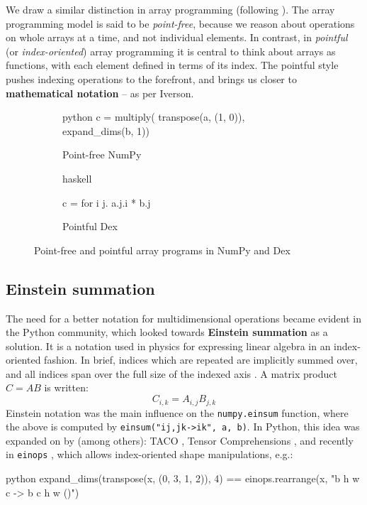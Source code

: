 We draw a similar distinction in array programming (following \textcite{paszke2021getting}).
The array programming model is said to be \textit{point-free}, because we reason about operations on whole arrays at a time, and not individual elements. 
In contrast, in \textit{pointful} (or \textit{index-oriented}) array programming it is central to think about arrays as functions, with each element defined in terms of its index. 
The pointful style pushes indexing operations to the forefront, and brings us closer to \textbf{mathematical notation} -- as per Iverson. 

\begin{figure}[h]
\centering
\begin{subfigure}{.4\textwidth}
  \centering
    \begin{cminted}{python}
c = multiply(
  transpose(a, (1, 0)),
  expand_dims(b, 1))
    \end{cminted}
      \caption{Point-free NumPy}
\end{subfigure}%
\begin{subfigure}{.4\textwidth}
  \centering
  \begin{cminted}{haskell}

c = for i j. a.j.i * b.j
  
  \end{cminted}
  \caption{Pointful Dex}
\end{subfigure}
\caption{Point-free and pointful array programs in NumPy and Dex}
\label{fig:point-arrays}
\end{figure}


\subsection{Einstein summation}

The need for a better notation for multidimensional operations became evident in the Python community, which looked towards \textbf{Einstein summation} as a solution. It is a notation used in physics for expressing linear algebra in an index-oriented fashion. In brief, indices which are repeated are implicitly summed over, and all indices span over the full size of the indexed axis \cite{aahlander2002einstein}. A matrix product $C = AB$ is written:
$$ C_{i,k} = A_{i,j} B_{j,k} $$
Einstein notation was the main influence on the \texttt{numpy.einsum} function, where the above is computed by \texttt{einsum("ij,jk->ik", a, b)}. In Python, this idea was expanded on by (among others): TACO \cite{kjolstad2017tensor}, Tensor Comprehensions \cite{vasilache2018tensor}, and recently in \texttt{einops} \cite{rogozhnikov2021einops}, which allows index-oriented shape manipulations, e.g.:
\begin{center}
\begin{cminted}{python}
expand_dims(transpose(x, (0, 3, 1, 2)), 4) == einops.rearrange(x, "b h w c -> b c h w ()")
\end{cminted}
\end{center}


